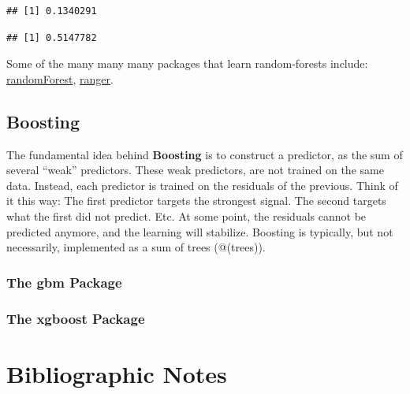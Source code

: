 \documentclass[]{book}
\newenvironment{Shaded}{\begin{snugshade}}{\end{snugshade}}
\newcommand{\KeywordTok}[1]{\textcolor[rgb]{0.13,0.29,0.53}{\textbf{#1}}}
\newcommand{\DataTypeTok}[1]{\textcolor[rgb]{0.13,0.29,0.53}{#1}}
\newcommand{\DecValTok}[1]{\textcolor[rgb]{0.00,0.00,0.81}{#1}}
\newcommand{\StringTok}[1]{\textcolor[rgb]{0.31,0.60,0.02}{#1}}
\newcommand{\CommentTok}[1]{\textcolor[rgb]{0.56,0.35,0.01}{\textit{#1}}}
\newcommand{\OperatorTok}[1]{\textcolor[rgb]{0.81,0.36,0.00}{\textbf{#1}}}
\newcommand{\NormalTok}[1]{#1}
\theoremstyle{definition}
\theoremstyle{definition}
\theoremstyle{definition}
\theoremstyle{remark}
\begin{document}
\begin{verbatim}
## [1] 0.1340291
\end{verbatim}

\begin{Shaded}
\end{Shaded}

\begin{verbatim}
## [1] 0.5147782
\end{verbatim}

Some of the many many many packages that learn random-forests include:
\href{https://cran.r-project.org/package=randomForest}{randomForest},
\href{https://cran.r-project.org/package=ranger}{ranger}.

\subsection{Boosting}\label{boosting}

The fundamental idea behind \textbf{Boosting} is to construct a
predictor, as the sum of several ``weak'' predictors. These weak
predictors, are not trained on the same data. Instead, each predictor is
trained on the residuals of the previous. Think of it this way: The
first predictor targets the strongest signal. The second targets what
the first did not predict. Etc. At some point, the residuals cannot be
predicted anymore, and the learning will stabilize. Boosting is
typically, but not necessarily, implemented as a sum of trees
(@(trees)).

\subsubsection{The gbm Package}\label{the-gbm-package}

\subsubsection{The xgboost Package}\label{the-xgboost-package}

\section{Bibliographic Notes}\label{bibliographic-notes-7}
\end{document}
